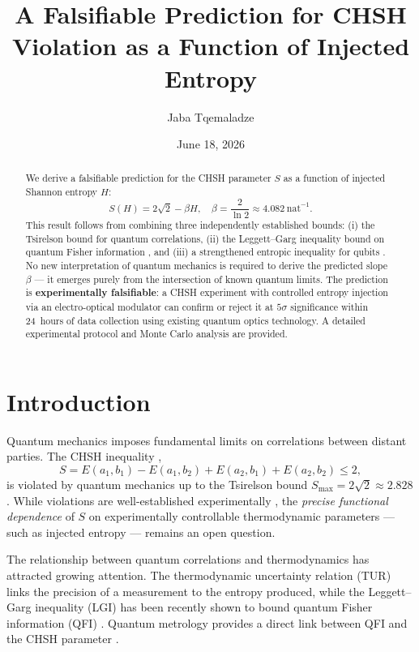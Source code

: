 \documentclass[a4paper]{quantumarticle}
\title{A Falsifiable Prediction for CHSH Violation as a Function of Injected Entropy}
\author{Jaba Tqemaladze}
\affiliation{Kutaisi International University, Georgia}
\affiliation{Georgia Longevity Alliance, Georgia}
\date{June 18, 2026}
\begin{document}
\maketitle

\begin{abstract}
We derive a falsifiable prediction for the CHSH parameter $S$ as a function of injected Shannon entropy $H$:
\[
S(H) = 2\sqrt{2} - \beta H,\quad \beta = \frac{2}{\ln 2} \approx 4.082\ \text{nat}^{-1}.
\]
This result follows from combining three independently established bounds: (i) the Tsirelson bound for quantum correlations, (ii) the Leggett--Garg inequality bound on quantum Fisher information \cite{abboud2026lgi}, and (iii) a strengthened entropic inequality for qubits \cite{hall2013correlation}. No new interpretation of quantum mechanics is required to derive the predicted slope $\beta$ --- it emerges purely from the intersection of known quantum limits. The prediction is \textbf{experimentally falsifiable}: a CHSH experiment with controlled entropy injection via an electro-optical modulator can confirm or reject it at $5\sigma$ significance within 24~hours of data collection using existing quantum optics technology. A detailed experimental protocol and Monte Carlo analysis are provided.
\end{abstract}

\section{Introduction}

Quantum mechanics imposes fundamental limits on correlations between distant parties. The CHSH inequality \cite{clauser1969proposed},
\[
S = E(a_1,b_1) - E(a_1,b_2) + E(a_2,b_1) + E(a_2,b_2) \leq 2,
\]
is violated by quantum mechanics up to the Tsirelson bound \cite{tsirelson1980quantum} $S_{\max} = 2\sqrt{2} \approx 2.828$. While violations are well-established experimentally \cite{hensen2015loophole, giustina2015loophole, shalm2015loophole}, the \emph{precise functional dependence} of $S$ on experimentally controllable thermodynamic parameters --- such as injected entropy --- remains an open question.

The relationship between quantum correlations and thermodynamics has attracted growing attention. The thermodynamic uncertainty relation (TUR) \cite{pearson2021thermodynamic, barato2015thermodynamic, gingrich2016dissipation} links the precision of a measurement to the entropy produced, while the Leggett--Garg inequality (LGI) has been recently shown to bound quantum Fisher information (QFI) \cite{abboud2026lgi}. Quantum metrology provides a direct link between QFI and the CHSH parameter \cite{seshadreesan2013chsh}.
\end{document}
